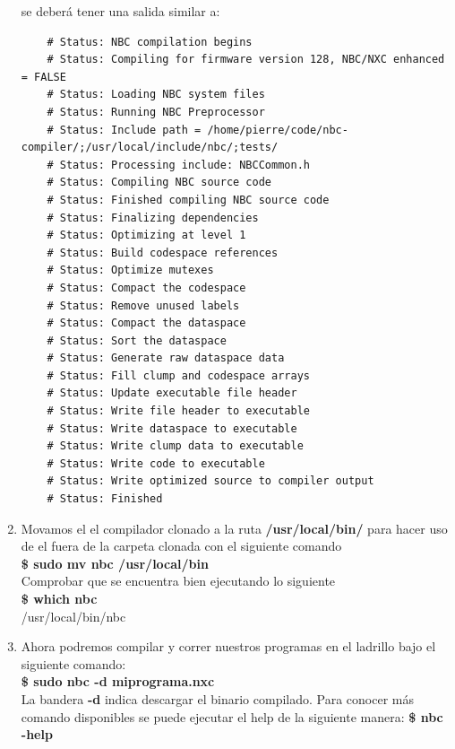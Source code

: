 \documentclass[oneside,twocolumn]{article}
\begin{document}
\begin{enumerate}
  se deberá tener una salida similar a:\\

  \begin{verbatim}
    # Status: NBC compilation begins
    # Status: Compiling for firmware version 128, NBC/NXC enhanced = FALSE
    # Status: Loading NBC system files
    # Status: Running NBC Preprocessor
    # Status: Include path = /home/pierre/code/nbc-compiler/;/usr/local/include/nbc/;tests/
    # Status: Processing include: NBCCommon.h
    # Status: Compiling NBC source code
    # Status: Finished compiling NBC source code
    # Status: Finalizing dependencies
    # Status: Optimizing at level 1
    # Status: Build codespace references
    # Status: Optimize mutexes
    # Status: Compact the codespace
    # Status: Remove unused labels
    # Status: Compact the dataspace
    # Status: Sort the dataspace
    # Status: Generate raw dataspace data
    # Status: Fill clump and codespace arrays
    # Status: Update executable file header
    # Status: Write file header to executable
    # Status: Write dataspace to executable
    # Status: Write clump data to executable
    # Status: Write code to executable
    # Status: Write optimized source to compiler output
    # Status: Finished
\end{verbatim}

\item Movamos el el compilador clonado a la ruta \textbf{/usr/local/bin/} para hacer uso de el fuera de la carpeta clonada con el siguiente comando\\

  \textbf{\$ sudo mv nbc /usr/local/bin}\\

  Comprobar que se encuentra bien ejecutando lo siguiente\\

  \textbf{\$ which nbc}\\
  /usr/local/bin/nbc\\

\item Ahora podremos compilar y correr nuestros programas en el ladrillo bajo el siguiente comando:\\

  \textbf{\$ sudo nbc -d miprograma.nxc}\\

  La bandera \textbf{-d} indica descargar el binario compilado. Para conocer más comando disponibles se puede ejecutar el help de la siguiente manera: \textbf{\$ nbc -help}\\
  
\end{enumerate}
\end{document}

